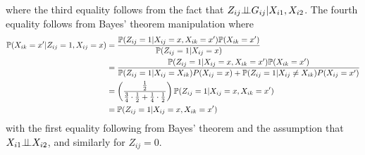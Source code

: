 \documentclass[10pt]{article}
\begin{document}
where the third equality follows from the fact that $Z_{ij}\condind G_{ij}|X_{i1},X_{i2}$. The fourth equality follows from Bayes' theorem manipulation where
\begin{align*}
\P(X_{ik}=x'|Z_{ij}=1,X_{ij}=x) &= \frac{\P(Z_{ij}=1|X_{ij}=x,X_{ik}=x')\P(X_{ik}=x')}{\P(Z_{ij}=1|X_{ij}=x)} \\
&= \frac{\P(Z_{ij}=1|X_{ij}=x,X_{ik}=x')\P(X_{ik}=x')}{\P(Z_{ij}=1|X_{ij}=X_{ik})P(X_{ij}=x) + \P(Z_{ij}=1|X_{ij}\neq X_{ik})P(X_{ij}=x')} \\
&= \left(\frac{\frac{1}{2}}{\frac{3}{4}\cdot\frac{1}{2}+\frac{1}{4}\cdot\frac{1}{2}}\right)\P(Z_{ij}=1|X_{ij}=x,X_{ik}=x') \\
&= \P(Z_{ij}=1|X_{ij}=x,X_{ik}=x')
\end{align*}
with the first equality following from Bayes' theorem and the assumption that $X_{i1}\condind X_{i2}$, and similarly for $Z_{ij}=0$.
\\
\end{document}
